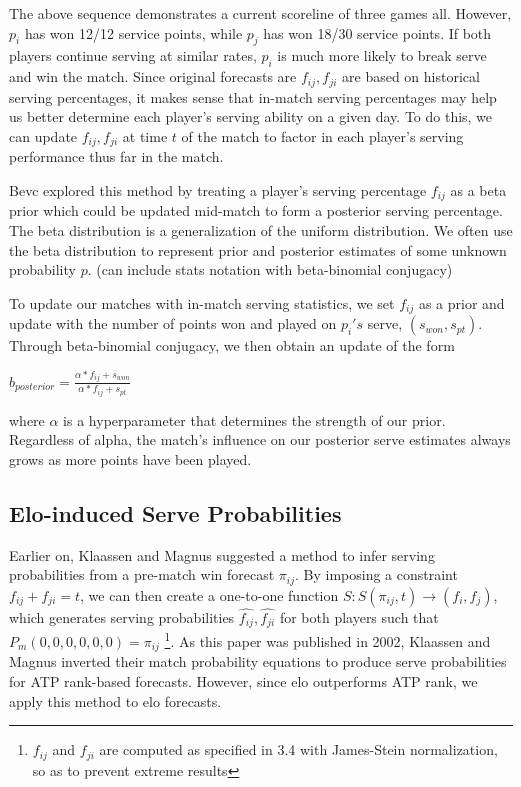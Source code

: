 \documentclass[chapterprefix=false]{report}
\begin{document}
The above sequence demonstrates a current scoreline of three games all. However, $p_i$ has won 12/12 service points, while $p_j$ has won 18/30 service points. If both players continue serving at similar rates, $p_i$ is much more likely to break serve and win the match. Since original forecasts are $f_{ij},f_{ji}$ are based on historical serving percentages, it makes sense that in-match serving percentages may help us better determine each player's serving ability on a given day. To do this, we can update $f_{ij},f_{ji}$ at time $t$ of the match to factor in each player's serving performance thus far in the match.

Bevc explored this method by treating a player's serving percentage $f_{ij}$ as a beta prior which could be updated mid-match to form a posterior serving percentage. The beta distribution is a generalization of the uniform distribution. We often use the beta distribution to represent prior and posterior estimates of some unknown probability $p$. (can include stats notation with beta-binomial conjugacy)

To update our matches with in-match serving statistics, we set $f_{ij}$ as a prior and update with the number of points won and played on $p_i's$ serve, $(s_{won},s_{pt})$. Through beta-binomial conjugacy, we then obtain an update of the form 

$b_{posterior} = \frac{\alpha * f_{ij}+ s_{won}}{\alpha * f_{ij} + s_{pt}}$

where $\alpha$ is a hyperparameter that determines the strength of our prior. Regardless of alpha, the match's influence on our posterior serve estimates always grows as more points have been played.

\subsection{Elo-induced Serve Probabilities}
Earlier on, Klaassen and Magnus suggested a method to infer serving probabilities from a pre-match win forecast $\pi_{ij}$. By imposing a constraint $f_{ij}+f_{ji}=t$, we can then create a one-to-one function 
$S: S(\pi_{ij},t) \rightarrow (f_i,f_j)$, which generates serving probabilities $\hat{f_{ij}},\hat{f_{ji}}$ for both players such that $P_{m}(0,0,0,0,0,0)=\pi_{ij}$ \footnote{$f_{ij}$ and $f_{ji}$ are computed as specified in 3.4 with James-Stein normalization, so as to prevent extreme results}. As this paper was published in 2002, Klaassen and Magnus inverted their match probability equations to produce serve probabilities for ATP rank-based forecasts. However, since elo outperforms ATP rank, we apply this method to elo forecasts.
\end{document}
